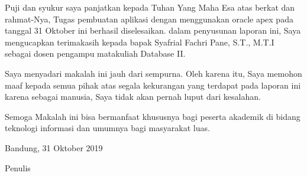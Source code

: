 \begin{acknowledgements}
Puji dan syukur saya panjatkan kepada Tuhan Yang Maha Esa atas berkat dan rahmat-Nya, Tugas pembuatan aplikasi dengan menggunakan oracle apex pada tanggal 31 Oktober ini berhasil diselesaikan. dalam penyusunan laporan ini, Saya mengucapkan terimakasih kepada bapak Syafrial Fachri Pane, S.T., M.T.I sebagai dosen pengampu matakuliah Database II.

Saya menyadari makalah ini jauh dari sempurna. Oleh karena itu, Saya memohon maaf kepada semua pihak atas segala kekurangan yang terdapat pada laporan ini karena sebagai manusia, Saya tidak akan pernah luput dari kesalahan. 

Semoga Makalah ini bisa bermanfaat khususnya bagi peserta akademik di bidang teknologi informasi dan umumnya bagi masyarakat luas. 

\begin{raggedleft}

Bandung, 31 Oktober 2019

Penulis

\end{raggedleft}

\end{acknowledgements}